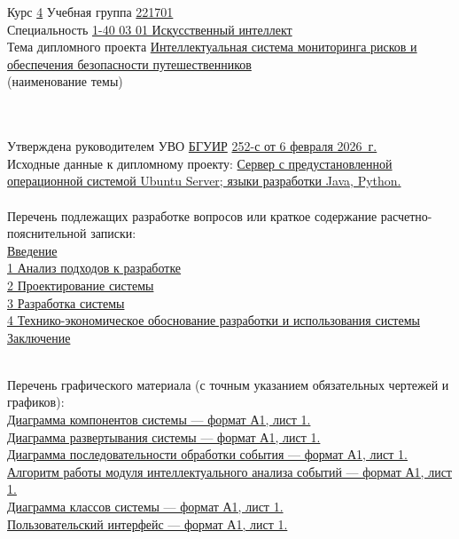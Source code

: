 {\begin{center}
  Курс \uline{4\hspace*{2em}} Учебная группа \uline{221701}\lineunderscore\\[0.5em]
  
  Специальность \uline{1-40 03 01 Искусственный интеллект}\lineunderscore\\[0.5em]

  Тема дипломного проекта \uline{Интеллектуальная система мониторинга рисков и обеспечения безопасности путешественников}\lineunderscore \\
  {\footnotesize\hspace{15em}(наименование темы)}\\[-0.5em]
  \lineunderscore\\[0.5em]\lineunderscore\\
  \end{center}

  Утверждена руководителем УВО \uline{БГУИР} \textnumero  \uline{252-с от 6 февраля 2026~г.}\lineunderscore\\[-0.5em]
  
  Исходные данные к дипломному проекту: \uline{Сервер с предустановленной операционной системой Ubuntu Server; языки разработки Java, Python.}\lineunderscore\\[0.5em]
  \lineunderscore\\
  
  Перечень подлежащих разработке вопросов или краткое содержание расчетно-пояснительной записки: 
  \lineunderscore\\
  \uline{Введение}\lineunderscore\\
  \uline{1 Анализ подходов к разработке}\lineunderscore\\
  \uline{2 Проектирование системы}\lineunderscore\\
  \uline{3 Разработка системы}\lineunderscore\\
  \uline{4 Технико-экономическое обоснование разработки и использования системы}\lineunderscore\\
  \uline{Заключение}\lineunderscore\\
  \lineunderscore\\
  \clearpage
  \thispagestyle{empty}

  Перечень графического материала (с точным указанием обязательных чертежей и графиков):
  \lineunderscore\\
  \uline{Диаграмма компонентов системы --- формат А1, лист 1. }\lineunderscore\\
  \uline{Диаграмма развертывания системы --- формат А1, лист 1. }\lineunderscore\\
  \uline{Диаграмма последовательности обработки события --- формат А1, лист 1. }\lineunderscore\\
  \uline{Алгоритм работы модуля интеллектуального анализа событий --- формат А1, лист 1. }\lineunderscore\\
  \uline{Диаграмма классов системы --- формат А1, лист 1. }\lineunderscore\\
  \uline{Пользовательский интерфейс --- формат А1, лист 1. }\lineunderscore\\
  \lineunderscore\\

}
